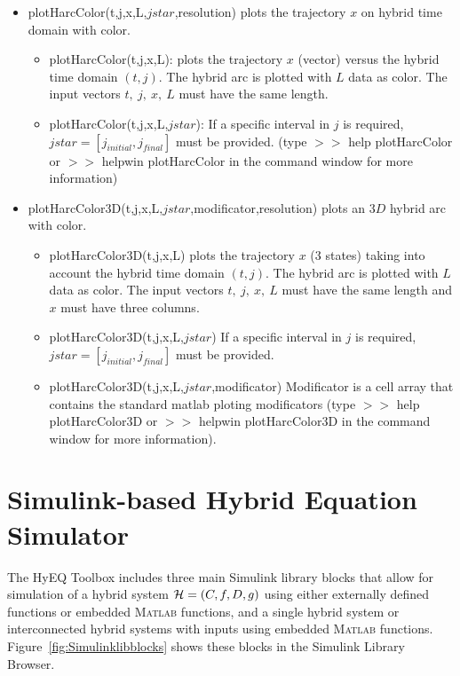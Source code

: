 \documentclass{article}
\newcommand{\matlab}{\textsc{Matlab}}
\begin{document}
\begin{itemize}
\item plotHarcColor(t,j,x,L,$jstar$,resolution) plots the trajectory $x$ on hybrid time domain with color.
\begin{itemize}
\item plotHarcColor(t,j,x,L): plots the trajectory $x$ (vector) versus the hybrid time domain $(t,j)$. The hybrid arc is plotted with $L$ data as color. The input vectors $t,\ j,\ x,\ L$ must have the same length. 
\item      plotHarcColor(t,j,x,L,$jstar$): If a specific interval in $j$ is required, $jstar = [j_{initial},
 j_{final}]$ must be provided. (type $>>$ help plotHarcColor or $>>$ helpwin plotHarcColor in the command window for more information)
\end{itemize}

\item plotHarcColor3D(t,j,x,L,$jstar$,modificator,resolution) plots an $3D$ hybrid arc with color.
\begin{itemize}
\item plotHarcColor3D(t,j,x,L) plots the trajectory $x$ (3 states) taking into account the hybrid time domain $(t,j)$. The hybrid arc is plotted with $L$ data as color. The input vectors $t,\ j,\ x,\ L$ must have the same length and $x$ must have three columns.
\item plotHarcColor3D(t,j,x,L,$jstar$) If a specific interval in $j$ is required, $jstar = [j_{initial},
 j_{final}]$ must be provided.
 \item plotHarcColor3D(t,j,x,L,$jstar$,modificator) Modificator is a cell array that contains the standard matlab ploting modificators (type $>>$ help plotHarcColor3D or $>>$ helpwin plotHarcColor3D in the command window for more information).
\end{itemize}
\end{itemize}

\section{Simulink-based Hybrid Equation Simulator}
\label{sec:HyEQsimulator}

The HyEQ Toolbox includes three main Simulink library blocks that allow for simulation of a hybrid system $\mathcal{H} =(C,f,D,g)$ using either externally defined functions or embedded \matlab{} functions, and a single hybrid system or interconnected hybrid systems with inputs using embedded \matlab{} functions. Figure~\ref{fig:Simulinklibblocks} shows these blocks in the Simulink Library Browser.
\end{document}
